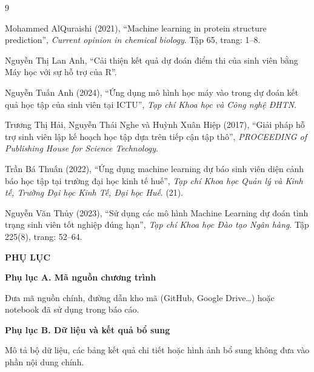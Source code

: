 \documentclass[12pt,a4paper,oneside]{report}
\begin{document}
\clearpage
{}
{}
\begin{thebibliography}{9}

Mohammed AlQuraishi (2021), ``Machine learning in protein structure
prediction'', \textit{Current opinion in chemical biology}. Tập 65, trang: 1--8.

Nguyễn Thị Lan Anh, ``Cải thiện kết quả dự đoán điểm thi của sinh viên
bằng Máy học với sự hỗ trợ của R''.

Nguyễn Tuấn Anh (2024), ``Ứng dụng mô hình học máy vào trong dự đoán kết
quả học tập của sinh viên tại ICTU'', \textit{Tạp chí Khoa học và Công nghệ ĐHTN}.

Trương Thị Hải, Nguyễn Thái Nghe và Huỳnh Xuân Hiệp (2017), ``Giải pháp
hỗ trợ sinh viên lập kế hoạch học tập dựa trên tiếp cận tập thô'',
\textit{PROCEEDING of Publishing House for Science Technology}.

Trần Bá Thuấn (2022), ``Ứng dụng machine learning dự báo sinh viên diện
cảnh báo học tập tại trường đại học kinh tế huế'', \textit{Tạp chí Khoa
học Quản lý và Kinh tế, Trường Đại học Kinh Tế, Đại học Huế}. (21).

Nguyễn Văn Thủy (2023), ``Sử dụng các mô hình Machine Learning dự đoán
tình trạng sinh viên tốt nghiệp đúng hạn'', \textit{Tạp chí Khoa học Đào
tạo Ngân hàng}. Tập 225(8), trang: 52--64.

\end{thebibliography}

\clearpage
{}
{}
\begin{center}
  {\bfseries\fontsize{14}{18}\selectfont PHỤ LỤC\par}
\end{center}
\vspace{12pt}

\noindent\textbf{Phụ lục A. Mã nguồn chương trình}

Đưa mã nguồn chính, đường dẫn kho mã (GitHub, Google Drive\dots) hoặc
notebook đã sử dụng trong báo cáo.

\noindent\textbf{Phụ lục B. Dữ liệu và kết quả bổ sung}

Mô tả bộ dữ liệu, các bảng kết quả chi tiết hoặc hình ảnh bổ sung không
đưa vào phần nội dung chính.
\end{document}
